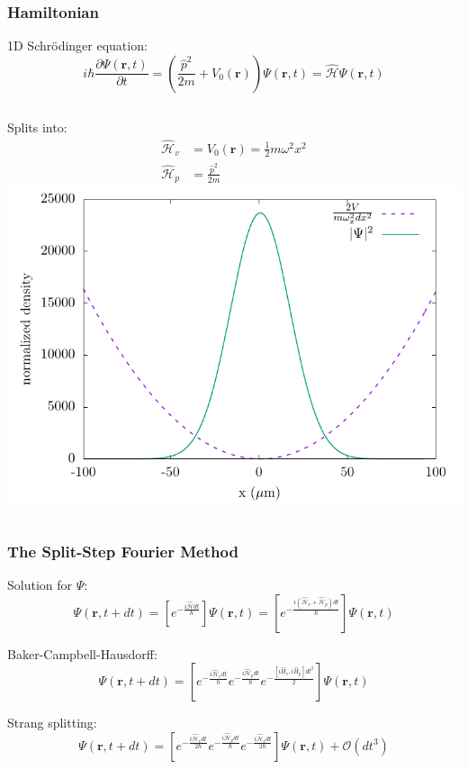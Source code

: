 \documentclass{beamer}
\begin{document}
\begin{frame}
\frametitle{Hamiltonian}
1D Schr\"odinger equation:
\begin{equation*}
i\hbar \frac{\partial \Psi(\mathbf{r}, t)}{\partial t} = \left(\frac{\hat p^2}{2m} + V_0(\mathbf{r}) \right)\Psi(\mathbf{r},t) = \mathcal{\hat H} \Psi(\mathbf{r},t)
\end{equation*}
\begin{columns}
\pause
Splits into:
\begin{align*}
\mathcal{\hat H}_v &= V_0(\mathbf{r}) = \frac{1}{2}m\omega^2x^2\\
\mathcal{\hat H}_p &= \frac{\hat p^2}{2m}
\end{align*}
\includegraphics[width=\textwidth]{SHO_2.pdf}
\end{columns}
\end{frame}

\begin{frame}
\frametitle{The Split-Step Fourier Method}

Solution for $\Psi$:
\begin{equation*}
\Psi(\mathbf{r},t + dt) = \left[e^{-\frac{i\mathcal{\hat{H}}dt}{\hbar}}\right]\Psi(\mathbf{r},t) = \left[e^{-\frac{i(\mathcal{\hat{H}}_v + \mathcal{\hat{H}}_p)dt}{\hbar}}\right]\Psi(\mathbf{r},t)
\end{equation*}

\pause
Baker-Campbell-Hausdorff:
\begin{equation*}
\Psi(\mathbf{r},t+dt) = \left[e^{-\frac{i\mathcal{\hat{H}}_vdt}{\hbar}}e^{-\frac{i\mathcal{\hat{H}}_pdt}{\hbar}}e^{-\frac{[i\hat{H}_v, i\hat{H}_p]dt^2}{2}}\right]\Psi(\mathbf{r},t)
\end{equation*}

\pause
Strang splitting:
\begin{equation*}
\Psi(\mathbf{r},t+dt) = \left[e^{-\frac{i\mathcal{\hat{H}}_vdt}{2\hbar}}e^{-\frac{i\mathcal{\hat{H}}_pdt}{\hbar}}e^{-\frac{i\mathcal{\hat{H}}_vdt}{2\hbar}} \right]\Psi(\mathbf{r},t) + \mathcal{O}(dt^3)
\end{equation*}

\end{frame}
\end{document}

